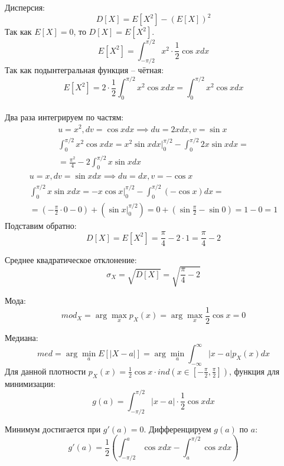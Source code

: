 \documentclass[a4paper,14pt]{extarticle}
\begin{document}
        Дисперсия:
        \[D[X] = E[X^2] - (E[X])^2\]
        Так как $E[X] = 0$, то $D[X] = E[X^2]$. 
        \[E[X^2] = \int_{-\pi/2}^{\pi/2} x^2 \cdot \frac{1}{2} \cos x dx\]
        Так как подынтегральная функция -- чётная: \[E[X^2] = 2 \cdot \frac{1}{2} \int_{0}^{\pi/2} x^2 \cos x dx = \int_{0}^{\pi/2} x^2 \cos x dx\]
        \\ Два раза интегрируем по частям:
        \begin{gather*}
            u = x^2, dv = \cos x dx \implies du = 2x dx, v = \sin x \\
            \int_{0}^{\pi/2} x^2 \cos x dx = x^2 \sin x dx |^{\pi/2}_{0} - \int_{0}^{\pi/2} 2x \sin x dx = \\ 
            = \frac{\pi^2}{4} - 2 \int_{0}^{\pi/2} x \sin x dx 
        \end{gather*}
        \begin{gather*}
            u = x, dv = \sin x dx \implies du = dx, v = -\cos x \\
            \int_{0}^{\pi/2} x \sin x dx = -x \cos x |^{\pi/2}_0 - \int_{0}^{\pi/2} (-\cos x) dx = \\
            = (-\frac{\pi}{2} \cdot 0 - 0) + (\sin x |^{\pi/2}_0) = 0 + (\sin \frac{\pi}{2} - \sin 0) = 1 - 0 = 1
        \end{gather*}
        Подставим обратно: 
        \[\boxed{D[X] = E[X^2] = \frac{\pi}{4} - 2 \cdot 1 = \frac{\pi}{4} - 2}\]

        Среднее квадратическое отклонение:
        \[\boxed{\sigma_X = \sqrt{D[X]} = \sqrt{\frac{\pi}{4} - 2}}\]

        Мода:
        \[\boxed{mod_X = \arg \max_x p_X(x) = \arg \max_x \frac{1}{2} \cos x = 0}\]

        Медиана: 
        $$
        med = \arg\min_a E[|X - a|] = \arg\min_a \int_{-\infty}^{\infty} |x - a| p_X(x) dx
        $$
        Для данной плотности $p_X(x) = \frac{1}{2} \cos x \cdot ind\left(x \in \left[-\frac{\pi}{2}, \frac{\pi}{2}\right]\right)$, функция для минимизации:
        $$
        g(a) = \int_{-\pi/2}^{\pi/2} |x - a| \cdot \frac{1}{2} \cos x dx
        $$

        Минимум достигается при $g'(a) = 0$. Дифференцируем $g(a)$ по $a$:
        $$
        g'(a) = \frac{1}{2} \left( \int_{-\pi/2}^{a} \cos x dx - \int_{a}^{\pi/2} \cos x dx \right)
        $$
\end{document}
